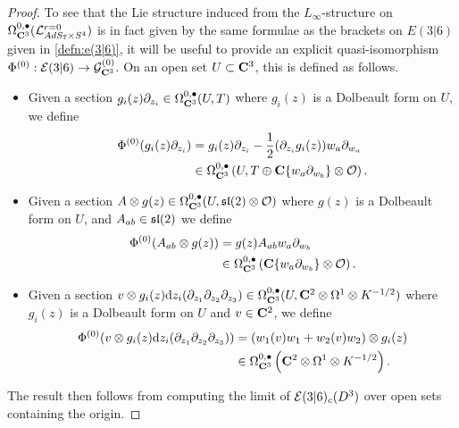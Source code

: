 \documentclass[../main.tex]{subfiles}
\begin{document}
\begin{proof}
To see that the Lie structure induced from the $L_\infty$-structure on $\Omega^{0,\bullet}_{\mathbf{C}^3} (\mathcal{L}^{r=0}_{AdS_7\times S^4} )$ is in fact given by the same formulae as the brackets on $E(3|6)$ given in \ref{defn:e(3|6)}, it will be useful to provide an explicit quasi-isomorphism $\Phi^{(0)} : \mathcal{E}(3|6) \to \mathcal{G}^{(0)}_{\mathbf{C}^3}$. On an open set $U\subset \mathbf{C}^3$, this is defined as follows.

\begin{itemize}
\item Given a section $g_i(z)\partial_{z_i}\in \Omega^{0,\bullet}_{\mathbf{C}^3} (U, T)$ where $g_i(z)$ is a Dolbeault form on $U$, we define
\begin{align*}
\Phi^{(0)} (g_i (z) \partial_{z_i} ) &= g_i (z) \partial_{z_i} - \frac 12(\partial_{z_i} g_i (z)) w_a \partial_{w_a} \\
&\in \Omega^{0,\bullet}_{\mathbf{C}^3} \left ( U, T \oplus \mathbf{C} \{w_a \partial_{w_b} \} \otimes \mathcal{O} \right ).  
\end{align*}

\item Given a section $A\otimes g(z)\in \Omega^{0,\bullet}_{\mathbf{C}^3} (U,\mathfrak{sl}(2) \otimes \mathcal{O})$ where $g(z)$ is a Dolbeault form on $U$, and $A_{ab}\in \mathfrak{sl}(2)$ we define
\begin{align*}
\Phi^{(0)} (A_{ab}\otimes g(z) ) &=  g(z) A_{ab}w_a\partial_{w_b}\\
&\in \Omega^{0,\bullet}_{\mathbf{C}^3} \left ( \mathbf{C} \{w_a \partial_{w_b} \} \otimes \mathcal{O} \right ).  
\end{align*}

\item Given a section $v\otimes g_i(z)\mathrm{d} z_i (\partial_{z_1}\partial_{z_2}\partial_{z_3} ) \in \Omega^{0,\bullet}_{\mathbf{C}^3} (U, \mathbf{C}^2\otimes \Omega^1\otimes K^{-1/2})$ where $g_i(z)$ is a Dolbeault form on $U$ and $v\in \mathbf{C}^2$, we define
\begin{align*}
\Phi^{(0)} (v\otimes g_i(z)\mathrm{d} z_i (\partial_{z_1}\partial_{z_2}\partial_{z_3} ) ) &= (w_1(v)w_1+w_2(v)w_2) \otimes g_i(z)  \\
&\in \Omega^{0,\bullet}_{\mathbf{C}^3} \left ( \mathbf{C}^2\otimes \Omega^1\otimes K^{-1/2}  \right ).  
\end{align*}
\end{itemize}

The result then follows from computing the limit of $\mathcal{E}(3|6)_c (D^3)$ over open sets containing the origin.
\end{proof}
\end{document}
